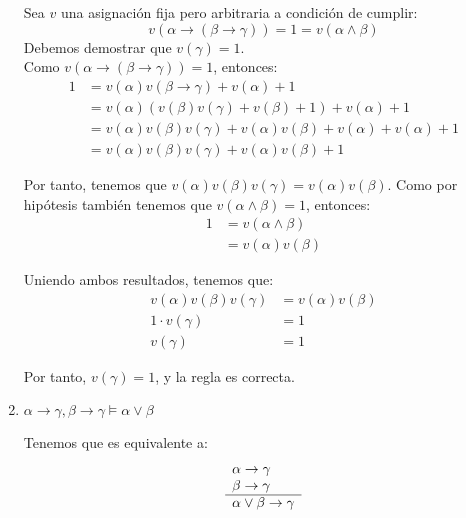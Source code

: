 \begin{ejercicio*}
\begin{enumerate}
        Sea $v$ una asignación fija pero arbitraria a condición de cumplir:
        \begin{equation*}
            v(\alpha\rightarrow(\beta\rightarrow\gamma)) = 1 = v(\alpha\land \beta)
        \end{equation*}
        Debemos demostrar que $v(\gamma)=1$.\\

        Como $v(\alpha\rightarrow(\beta\rightarrow\gamma))=1$, entonces:
        \begin{align*}
            1 &= v(\alpha)v(\beta\rightarrow\gamma)+v(\alpha)+1\\
            &= v(\alpha)(v(\beta)v(\gamma)+v(\beta)+1)+v(\alpha)+1\\
            &= v(\alpha)v(\beta)v(\gamma)+v(\alpha)v(\beta)+v(\alpha)+v(\alpha)+1\\
            &= v(\alpha)v(\beta)v(\gamma)+v(\alpha)v(\beta)+1
        \end{align*}

        Por tanto, tenemos que $v(\alpha)v(\beta)v(\gamma)=v(\alpha)v(\beta)$.
        Como por hipótesis también tenemos que $v(\alpha\land\beta)=1$, entonces:
        \begin{align*}
            1 &= v(\alpha \land \beta)\\
            &= v(\alpha)v(\beta)
        \end{align*}

        Uniendo ambos resultados, tenemos que:
        \begin{align*}
            v(\alpha)v(\beta)v(\gamma)&=v(\alpha)v(\beta)\\
            1\cdot v(\gamma)&=1\\
            v(\gamma)&=1
        \end{align*}
        
        Por tanto, $v(\gamma)=1$, y la regla es correcta.

        \item $\alpha\rightarrow \gamma, \beta\rightarrow \gamma \vDash \alpha\lor\beta$

        Tenemos que es equivalente a:
        \begin{equation*}
            \begin{array}{l}
                \alpha\rightarrow\gamma\\
                \beta\rightarrow\gamma\\ \hline
                \multicolumn{1}{c}{\alpha\lor\beta \rightarrow\gamma}        
            \end{array}
        \end{equation*}


\end{enumerate}
\end{ejercicio*}
